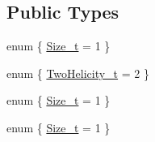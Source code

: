 \subsection*{Public Types}
\begin{DoxyCompactItemize}
\item 
enum \{ \mbox{\hyperlink{structHadron_1_1H1D2B1Rep_a6bdbc6474f7fdca1c7c2fd6d83a968eba6a867974a9f4edc41564112b4af7978e}{Size\+\_\+t}} = 1
 \}
\item 
enum \{ \mbox{\hyperlink{structHadron_1_1H1D2B1Rep_a679c57c4654cf06488a48fdfa4c13839a9662832570e5f3d208035967a86cbee6}{Two\+Helicity\+\_\+t}} = 2
 \}
\item 
enum \{ \mbox{\hyperlink{structHadron_1_1H1D2B1Rep_a6bdbc6474f7fdca1c7c2fd6d83a968eba6a867974a9f4edc41564112b4af7978e}{Size\+\_\+t}} = 1
 \}
\item 
enum \{ \mbox{\hyperlink{structHadron_1_1H1D2B1Rep_a6bdbc6474f7fdca1c7c2fd6d83a968eba6a867974a9f4edc41564112b4af7978e}{Size\+\_\+t}} = 1
 \}
\end{DoxyCompactItemize}

